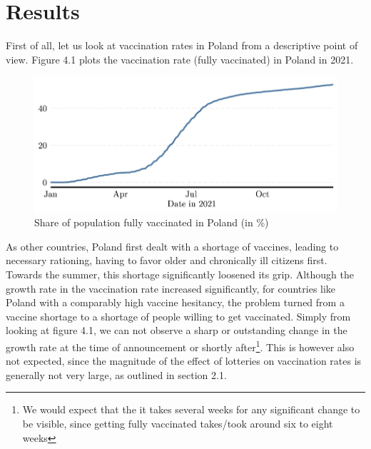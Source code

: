 \documentclass{scrbook}
\begin{document}
\chapter{Results}

First of all, let us look at vaccination rates in Poland from a
descriptive point of view. Figure 4.1 plots the vaccination rate (fully
vaccinated) in Poland in 2021.

\begin{figure}[h]
\caption{Share of population fully vaccinated in Poland (in \%)}

\begin{center}\includegraphics{bachelor_thesis_files/figure-latex/unnamed-chunk-2-1} \end{center}
\end{figure}

\noindent As other countries, Poland first dealt with a shortage of
vaccines, leading to necessary rationing, having to favor older and
chronically ill citizens first. Towards the summer, this shortage
significantly loosened its grip. Although the growth rate in the
vaccination rate increased significantly, for countries like Poland with
a comparably high vaccine hesitancy, the problem turned from a vaccine
shortage to a shortage of people willing to get vaccinated. Simply from
looking at figure 4.1, we can not observe a sharp or outstanding change
in the growth rate at the time of announcement or shortly
after\footnote{We would expect that the it takes several weeks for any significant change to be visible, since getting fully vaccinated takes/took around six to eight weeks}.
This is however also not expected, since the magnitude of the effect of
lotteries on vaccination rates is generally not very large, as outlined
in section 2.1.
\end{document}
